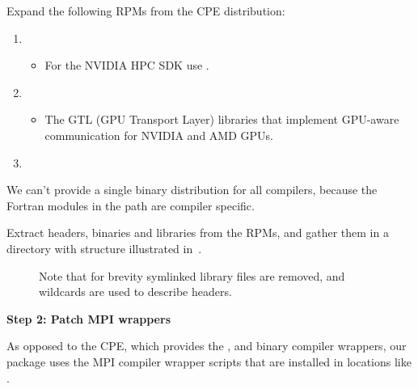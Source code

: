 Expand the following RPMs from the CPE distribution:
\begin{enumerate}
    \item {}
    \begin{itemize}
        \item For the NVIDIA HPC SDK use .
    \end{itemize}
    \item {}
    \begin{itemize}
        \item The GTL (GPU Transport Layer) libraries that implement GPU-aware communication for NVIDIA and AMD GPUs.
    \end{itemize}
    \item {}
\end{enumerate}

We can't provide a single binary distribution for all compilers, because the Fortran modules in the  path are compiler specific.

Extract headers, binaries and libraries from the RPMs, and gather them in a directory with structure illustrated in~.

\begin{figure}[htp!]
    
    \caption{ Note that for brevity symlinked library files are removed, and wildcards are used to describe headers.}
    \label{fig:mpich-tree}
\end{figure}


\noindent\textbf{Step 2: Patch MPI wrappers}

As opposed to the CPE, which provides the ,  and  binary compiler wrappers, our package uses the MPI compiler wrapper scripts that are installed in locations like .

